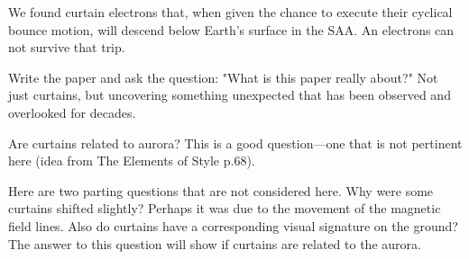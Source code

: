 \documentclass[draft]{agujournal2019}
\begin{document}
We found curtain electrons that, when given the chance to execute their cyclical bounce motion, will descend below Earth's surface in the SAA. An electrons can not survive that trip.

Write the paper and ask the question: "What is this paper really about?" Not just curtains, but uncovering something unexpected that has been observed and overlooked for decades.

Are curtains related to aurora? This is a good question---one that is not pertinent here (idea from The Elements of Style p.68).

Here are two parting questions that are not considered here. Why were some curtains shifted slightly? Perhaps it was due to the movement of the magnetic field lines. Also do curtains have a corresponding visual signature on the ground? The answer to this question will show if curtains are related to the aurora.


%
\end{document}
